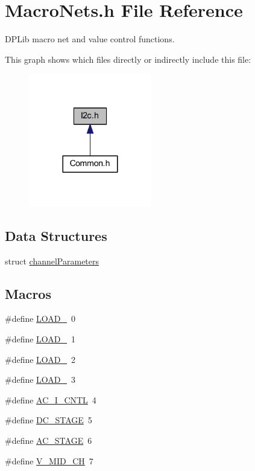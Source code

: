 \hypertarget{a00020}{\section{Macro\-Nets.\-h File Reference}
\label{a00020}
}


D\-P\-Lib macro net and value control functions.  


This graph shows which files directly or indirectly include this file\-:
\nopagebreak
\begin{figure}[H]
\begin{center}
\leavevmode
\includegraphics[width=152pt]{a00049}
\end{center}
\end{figure}
\subsection*{Data Structures}
\begin{DoxyCompactItemize}
\item 
struct \hyperlink{a00003}{channel\-Parameters}
\end{DoxyCompactItemize}
\subsection*{Macros}
\begin{DoxyCompactItemize}
\item 
\#define \hyperlink{a00020_a007a209cd2e2b935be1f69218652edc1}{L\-O\-A\-D\-\_}~0
\item 
\#define \hyperlink{a00020_a363f09c63f2ecb9086b47d72a3f3f57d}{L\-O\-A\-D\-\_}~1
\item 
\#define \hyperlink{a00020_af7c1e96216e7b48160e5a03afe8ac807}{L\-O\-A\-D\-\_}~2
\item 
\#define \hyperlink{a00020_a2c862ec4115c4a016b61800609f236a7}{L\-O\-A\-D\-\_}~3
\item 
\#define \hyperlink{a00020_ab875424e7a295e6a0eae1605b3285adb}{A\-C\-\_\-\-I\-\_\-\-C\-N\-T\-L}~4
\item 
\#define \hyperlink{a00020_af3967a451ed4068ca1cbf55dd2de3799}{D\-C\-\_\-\-S\-T\-A\-G\-E}~5
\item 
\#define \hyperlink{a00020_a3fc4318ae73eae35339f616047300b0f}{A\-C\-\_\-\-S\-T\-A\-G\-E}~6
\item 
\#define \hyperlink{a00020_a1ae2d3caef45c64fbb9175c50c27ce09}{V\-\_\-\-M\-I\-D\-\_\-\-C\-H}~7
\end{DoxyCompactItemize}
